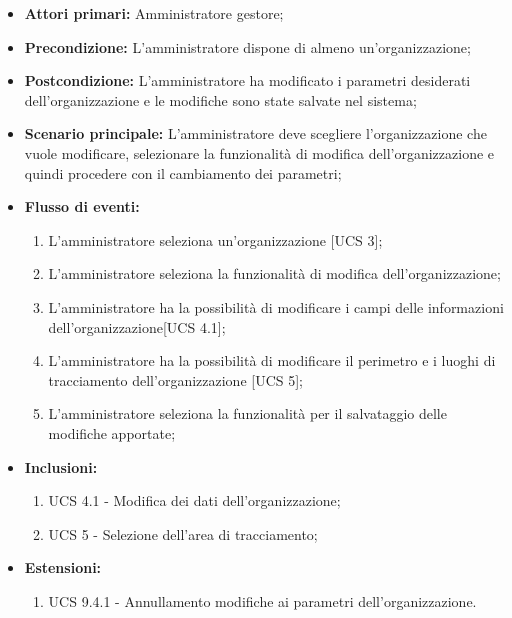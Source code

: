 \begin{itemize}
    \item \textbf{Attori primari:} Amministratore gestore;
    \item \textbf{Precondizione:} L’amministratore dispone di almeno un'organizzazione;
    \item \textbf{Postcondizione:} L’amministratore ha modificato i parametri desiderati dell'organizzazione e le modifiche sono state salvate nel sistema;
    \item \textbf{Scenario principale:} L'amministratore deve scegliere l'organizzazione che vuole modificare, selezionare la funzionalità di modifica dell'organizzazione e quindi procedere con il cambiamento dei parametri;
    \item \textbf{Flusso di eventi:}
    \begin{enumerate}
        \item L'amministratore seleziona un'organizzazione [UCS 3];
        \item L'amministratore seleziona la funzionalità di modifica dell'organizzazione;
        \item L'amministratore ha la possibilità di modificare i campi delle informazioni dell’organizzazione[UCS 4.1];
        \item L'amministratore ha la possibilità di modificare il perimetro e i luoghi di tracciamento dell’organizzazione [UCS 5];
        \item L'amministratore seleziona la funzionalità per il salvataggio delle modifiche apportate;
    \end{enumerate}
    \item \textbf{Inclusioni:}
    \begin{enumerate}
        \item UCS 4.1 - Modifica dei dati dell'organizzazione;
        \item UCS 5 - Selezione dell'area di tracciamento;
    \end{enumerate}
    \item \textbf{Estensioni:}
    \begin{enumerate}
        \item UCS 9.4.1 - Annullamento modifiche ai parametri dell'organizzazione.
    \end{enumerate}
\end{itemize}

